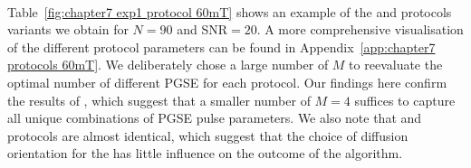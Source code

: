 \paragraph{}
Table~\ref{fig:chapter7 exp1 protocol 60mT} shows an example of the \OI{} and \SF{} protocols variants we obtain for $N=90$ and SNR$=20$. A more comprehensive visualisation of the different protocol parameters can be found in Appendix~\ref{app:chapter7 protocols 60mT}. We deliberately chose a large number of $M$ to reevaluate the optimal number of different PGSE for each protocol. Our findings here confirm the results of \citep{Alexander:2008}, which suggest that a smaller number of $M=4$ suffices to capture all unique combinations of PGSE pulse parameters. We also note that {\OI} and {\SD} protocols are almost identical, which suggest that the choice of diffusion orientation for the {\OI} has little influence on the outcome of the algorithm.
